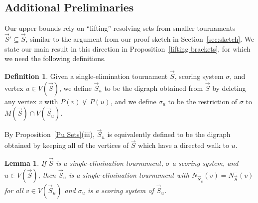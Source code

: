 \documentclass[12pt,letterpaper]{article}
\newtheorem{lem}[thm]{Lemma}
\theoremstyle{definition}
\newtheorem{defn}{Definition}
\newcommand{\sig}{\sigma}
\renewcommand{\1}{\mathbbm{1}}
\newcommand{\sub}{\subseteq}
\newcommand{\tour}{\vec{S}}
\begin{document}
\subsection{Additional Preliminaries}
Our upper bounds rely on ``lifting'' resolving sets from smaller tournaments $\tour'\sub \tour$, similar to the argument from our proof sketch in Section~\ref{sec:sketch}.  We state our main result in this direction in Proposition~\ref{lifting brackets}, for which we need the following definitions.

\begin{defn}
	Given a single-elimination tournament $\tour$, scoring system $\sig$, and vertex $u\in V(\tour)$, we define $\tour_u$ to be the digraph obtained from $\tour$ by deleting any vertex $v$ with $P(v)\not\sub P(u)$, and we define $\sig_u$ to be the restriction of $\sig$ to $M(\tour)\cap V(\tour_u)$.
\end{defn}
By Proposition~\ref{Pu Sets}(iii), $\tour_u$ is equivalently defined to be the digraph obtained by keeping all of the vertices of $\tour$ which have a directed walk to $u$.
\begin{lem}\label{touru are tournaments}
	If $\tour$ is a single-elimination tournament, $\sig$ a scoring system, and $u\in V(\tour)$, then  $\tour_u$ is a single-elimination tournament with $N^-_{\tour_u}(v)=N^-_{\tour}(v)$ for all $v\in V(\tour_u)$ and $\sig_u$ is a scoring system of $\tour_u$.
\end{lem}
\end{document}
